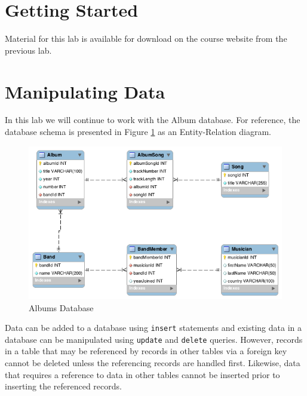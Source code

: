 \documentclass[12pt]{scrartcl}
\begin{document}


\section*{Getting Started}

Material for this lab is available for download on the course website
from the previous lab.

\section*{Manipulating Data}

In this lab we will continue to work with the Album database.  For 
reference, the database schema is presented in Figure \ref{figure:albumDB} 
as an Entity-Relation diagram.

\begin{figure}[h]
\centering
\includegraphics[scale=.650]{images/albums}
\caption{Albums Database}
\label{figure:albumDB}
\end{figure}

Data can be added to a database using \texttt{insert} statements 
and existing data in a database can be manipulated using \texttt{update}
and \texttt{delete} queries.  However, records in a table that may be
referenced by records in other tables via a foreign key cannot be deleted
unless the referencing records are handled first.  Likewise, data that requires
a reference to data in other tables cannot be inserted prior to inserting the
referenced records.  
\end{document}
